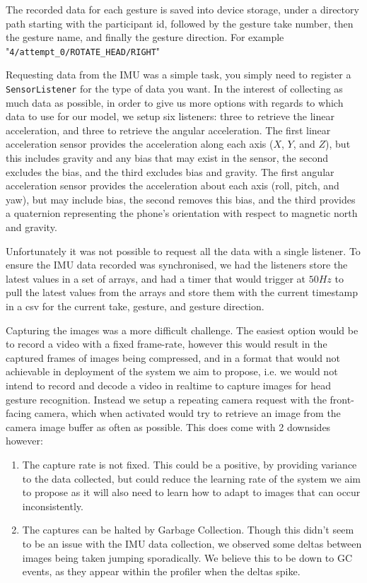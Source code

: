 The recorded data for each gesture is saved into device storage, under a directory path starting with the participant id, followed by the gesture take number, then the gesture name, and finally the gesture direction. For example "\verb|4/attempt_0/ROTATE_HEAD/RIGHT|"

Requesting data from the IMU was a simple task, you simply need to register a \verb|SensorListener| for the type of data you want. In the interest of collecting as much data as possible, in order to give us more options with regards to which data to use for our model, we setup six listeners: three to retrieve the linear acceleration, and three to retrieve the angular acceleration.
The first linear acceleration sensor provides the acceleration along each axis ($X$, $Y$, and $Z$), but this includes gravity and any bias that may exist in the sensor, the second excludes the bias, and the third excludes bias and gravity.
The first angular acceleration sensor provides the acceleration about each axis (roll, pitch, and yaw), but may include bias, the second removes this bias, and the third provides a quaternion representing the phone's orientation with respect to magnetic north and gravity.

Unfortunately it was not possible to request all the data with a single listener. To ensure the IMU data recorded was synchronised, we had the listeners store the latest values in a set of arrays, and had a timer that would trigger at $50Hz$ to pull the latest values from the arrays and store them with the current timestamp in a csv for the current take, gesture, and gesture direction.

Capturing the images was a more difficult challenge.
The easiest option would be to record a video with a fixed frame-rate, however this would result in the captured frames of images being compressed, and in a format that would not achievable in deployment of the system we aim to propose, i.e. we would not intend to record and decode a video in realtime to capture images for head gesture recognition.
Instead we setup a repeating camera request with the front-facing camera, which when activated would try to retrieve an image from the camera image buffer as often as possible. This does come with 2 downsides however: 
\begin{enumerate}
    \item The capture rate is not fixed. This could be a positive, by providing variance to the data collected, but could reduce the learning rate of the system we aim to propose as it will also need to learn how to adapt to images that can occur inconsistently.
    \item The captures can be halted by Garbage Collection. Though this didn't seem to be an issue with the IMU data collection, we observed some deltas between images being taken jumping sporadically. We believe this to be down to GC events, as they appear within the profiler when the deltas spike.
\end{enumerate} 

